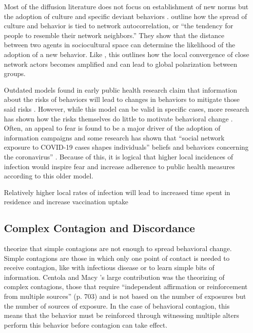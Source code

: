 Most of the diffusion literature does not focus on establishment of new norms
but the adoption of culture and specific deviant behaviors \citep[see][for an
exception]{centolaSpontaneousEmergenceConventions2015}.
\citet{dellapostaWhyLiberalsDrink2015} outline how the spread of culture and
behavior is tied to network autocorrelation, or ``the tendency for people to
resemble their network neighbors.'' They show that the distance between two
agents in sociocultural space can determine the likelihood of the adoption of a
new behavior. Like \citet{axelrodDisseminationCultureModel1997}, this outlines
how the local convergence of close network actors becomes amplified and can lead
to global polarization between groups.

Outdated models found in early public health research claim that information
about the risks of behaviors will lead to changes in behaviors to mitigate those
said risks \citep[e.g.][]{flay_etal80}. However, while this model can be valid
in specific cases, more research has shown how the risks themselves do little to
motivate behavioral change \citep{witte_allen00,wolburg06}. Often, an appeal to
fear is found to be a major driver of the adoption of information campaigns and
some research has shown that ``social network exposure to COVID-19 cases shapes
individuals'' beliefs and behaviors concerning the coronavirus''
\citep{bailey_etal20}. Because of this, it is logical that higher local
incidences of infection would inspire fear and increase adherence to public
health measures according to this older model.

\begin{hyp2} \label{hyp:infection}
 Relatively higher local rates of infection will lead to increased time spent in residence and increase vaccination uptake
\end{hyp2}


\hypertarget{complex-contagion-and-discordance}{\subsection{Complex Contagion and Discordance}\label{complex-contagion-and-discordance}}

\citet{centolaComplexContagionsWeakness2007} theorize that simple contagions are
not enough to spread behavioral change. Simple contagions are those in which
only one point of contact is needed to receive contagion, like with infectious
disease or to learn simple bits of information. Centola and Macy
\citeyearpar{centolaComplexContagionsWeakness2007}'s large contribution was the
theorizing of complex contagions, those that require ``independent affirmation
or reinforcement from multiple sources'' (p. 703) and is not based on the number
of exposures but the number of sources of exposure. In the case of behavioral
contagion, this means that the behavior must be reinforced through witnessing
multiple alters perform this behavior before contagion can take effect.

